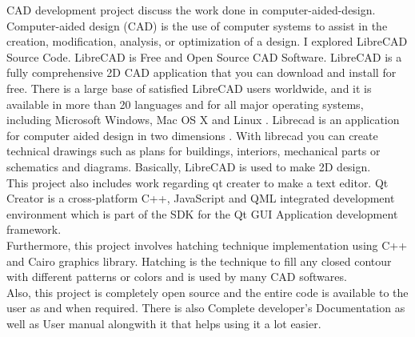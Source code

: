 \begin{Large}
\end{Large}

\noindent CAD development project discuss the work done in computer-aided-design. Computer-aided design (CAD) is the use of computer systems to assist in the creation, modification, analysis, or optimization of a design. I explored  LibreCAD  Source  Code. LibreCAD is Free and Open Source CAD Software. LibreCAD is a  fully  comprehensive  2D  CAD   application  that  you  can  download  and  install  for  free.  There  is  a  large base  of  satisfied  LibreCAD   users  worldwide,  and  it  is  available  in  more  than  20  languages  and  for  all
major  operating  systems,  including  Microsoft  Windows,  Mac  OS  X  and  Linux .  Librecad  is  an  application  for  computer  aided  design  in  two dimensions  .  With  librecad   you   can  create  technical  drawings  such  as  plans  for  buildings,  interiors,
mechanical parts or schematics and diagrams. Basically, LibreCAD is used to make 2D design. \\
\noindent This project also includes work regarding qt creater to make a text editor. Qt Creator is a cross-platform C++, JavaScript and QML integrated development environment which is part of the SDK for the Qt GUI Application development framework.\\ 
\noindent Furthermore, this project involves hatching technique implementation using C++ and Cairo graphics library. Hatching is the technique to fill any closed contour with different patterns or colors and is used by many CAD softwares.\\
\noindent Also, this project is completely open source and the entire code is available 
to the user as and when required. There is also Complete developer's 
Documentation as well as User manual alongwith it that helps using it a lot easier.